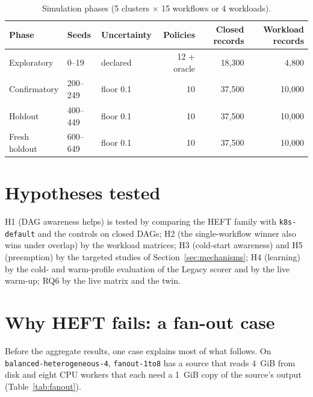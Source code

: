 \documentclass[12pt,a4paper]{report}
\newcommand{\pol}[1]{\texttt{#1}}
\begin{document}
\begin{table}[ht]
\centering
\small
\begin{tabular}{lllrrr}
\toprule
Phase & Seeds & Uncertainty & Policies & Closed records & Workload records \\
\midrule
Exploratory & 0--19 & declared & 12 + oracle & 18,300 & 4,800 \\
Confirmatory & 200--249 & floor 0.1 & 10 & 37,500 & 10,000 \\
Holdout & 400--449 & floor 0.1 & 10 & 37,500 & 10,000 \\
Fresh holdout & 600--649 & floor 0.1 & 10 & 37,500 & 10,000 \\
\bottomrule
\end{tabular}
\caption{Simulation phases (5 clusters $\times$ 15 workflows or 4 workloads).}
\label{tab:phases}
\end{table}

\section{Hypotheses tested}

H1 (DAG awareness helps) is tested by comparing the HEFT family with
\pol{k8s-default} and the controls on closed DAGs; H2 (the single-workflow
winner also wins under overlap) by the workload matrices; H3 (cold-start
awareness) and H5 (preemption) by the targeted studies of
Section~\ref{sec:mechanisms}; H4 (learning) by the cold- and warm-profile
evaluation of the Legacy scorer and by the live warm-up; RQ6 by the live
matrix and the twin.

\section{Why HEFT fails: a fan-out case}
\label{sec:heft-failure}

Before the aggregate results, one case explains most of what follows. On
\texttt{balanced-heterogeneous-4}, \texttt{fanout-1to8} has a source that
reads 4~GiB from disk and eight CPU workers that each need a 1~GiB copy
of the source's output (Table~\ref{tab:fanout}).

\begin{table}[ht]
\centering
\small
{}
\caption{The fan-out case (seed 0). Data moved includes image pulls.}
\label{tab:fanout}
\end{table}
\end{document}
